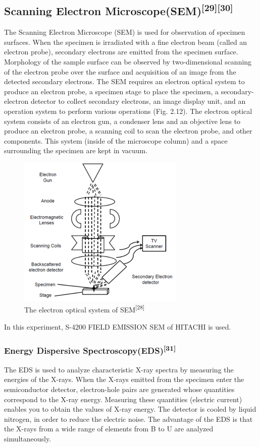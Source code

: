 \subsection{Scanning Electron Microscope(SEM)\textsuperscript{[29][30]}}
The Scanning Electron Microscope (SEM) is used for observation of specimen surfaces. When the specimen is irradiated with a fine electron beam (called an electron probe), secondary electrons are emitted from the specimen surface. Morphology of the sample surface can be observed by two-dimensional scanning of the electron probe over the surface and acquisition of an image from the detected secondary electrons. The SEM requires an electron optical system to produce an electron probe, a specimen stage to place the specimen, a secondary-electron detector to collect secondary electrons, an image display unit, and an operation system to perform various operations (Fig. 2.12). The electron optical system consists of an electron gun, a condenser lens and an objective lens to produce an electron probe, a scanning coil to scan the electron probe, and other components. This system (inside of the microscope column) and a space surrounding the specimen are kept in vacuum.
\begin{figure}[H]
\centering
\includegraphics[width=8cm]{src/fig/fig28.png}
\caption{The electron optical system of SEM\textsuperscript{[28]}}
\end{figure}
In this experiment, S-4200 FIELD EMISSION SEM of HITACHI is used.
\subsubsection{Energy Dispersive Spectroscopy(EDS)\textsuperscript{[31]}}
The EDS is used to analyze characteristic X-ray spectra by measuring the energies of the X-rays. When the X-rays emitted from the specimen enter the semiconductor detector, electron-hole pairs are generated whose quantities correspond to the X-ray energy. Measuring these quantities (electric current) enables you to obtain the values of X-ray energy. The detector is cooled by liquid nitrogen, in order to reduce the electric noise. The advantage of the EDS is that the X-rays from a wide range of elements from B to U are analyzed simultaneously. 

